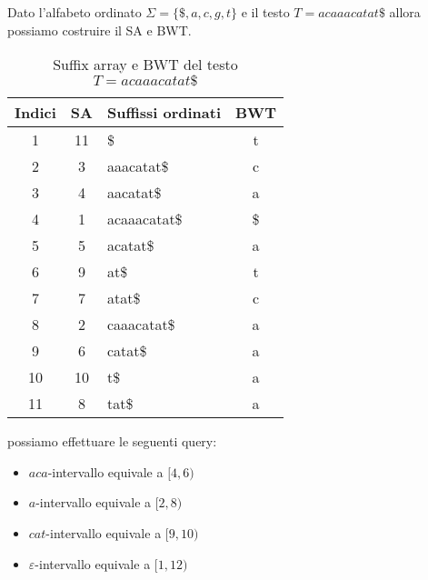 \begin{esempio} \label{esempio-bwt}
    Dato l'alfabeto ordinato $\Sigma=\{\$, a, c, g, t\}$ e il testo
    $T=acaaacatat\$$ allora possiamo costruire il SA e BWT.
    \begin{table}[!ht]
        \centering
        \begin{tabular}{|c|c|l|c|}
            \hline
            \rowcolor[HTML]{EFEFEF}
            \textbf{Indici} & \textbf{SA} & \textbf{Suffissi ordinati} & \textbf{BWT} \\ \hline
            1               & 11          & \$                         & t            \\ \hline
            2               & 3           & aaacatat\$                 & c            \\ \hline
            3               & 4           & aacatat\$                  & a            \\ \hline
            4               & 1           & acaaacatat\$               & \$           \\ \hline
            5               & 5           & acatat\$                   & a            \\ \hline
            6               & 9           & at\$                       & t            \\ \hline
            7               & 7           & atat\$                     & c            \\ \hline
            8               & 2           & caaacatat\$                & a            \\ \hline
            9               & 6           & catat\$                    & a            \\ \hline
            10              & 10          & t\$                        & a            \\ \hline
            11              & 8           & tat\$                      & a            \\ \hline
        \end{tabular}
        \caption{Suffix array e BWT del testo $T=acaaacatat\$$}
    \end{table}
    possiamo effettuare le seguenti query:
    \begin{itemize}
        \item $aca$-intervallo equivale a $[4,6)$
        \item $a$-intervallo equivale a $[2,8)$
        \item $cat$-intervallo equivale a $[9,10)$
        \item $\varepsilon$-intervallo equivale a $[1,12)$
    \end{itemize}
\end{esempio}
